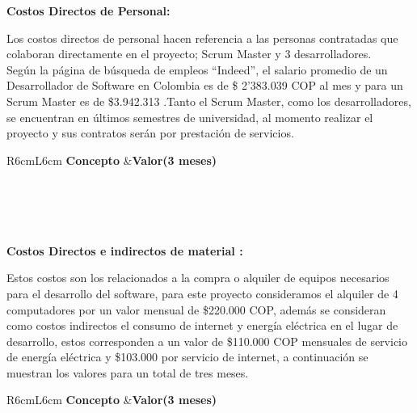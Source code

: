 \documentclass[a4paper,12 pt]{article}
\begin{document}
\textbf{Costos Directos de Personal:}

Los costos directos de personal hacen referencia a las personas contratadas que colaboran directamente en el proyecto; Scrum Master y 3 desarrolladores.\\

Según la página de búsqueda de empleos “Indeed”\cite{01}, el salario promedio de un Desarrollador de Software en Colombia es de \$ 2’383.039 COP al mes y para un Scrum Master es de \$3.942.313 .Tanto el Scrum Master, como los desarrolladores, se encuentran en últimos semestres de universidad, al momento realizar el proyecto y sus contratos serán por prestación de servicios. 

\begin{table}[H]
    \centering
    \small{
    \begin{tabular}{R{6cm}L{6cm}}
        \textbf{Concepto}   &\textbf{Valor(3 meses)}\\
        \\
         \\
         \\
        \hline
         \\
    \end{tabular}
    \label{T03}}
\end{table}{}

\textbf{Costos Directos e indirectos de material :}

Estos costos son los relacionados a la compra o alquiler de equipos necesarios para el desarrollo del software, para este proyecto consideramos el alquiler de 4 computadores\cite{02} por un valor mensual de \$220.000 COP, además se consideran como costos indirectos el consumo de internet y energía eléctrica en el lugar de desarrollo, estos corresponden a un valor de \$110.000 COP mensuales de servicio de energía eléctrica y \$103.000 por servicio de internet, a continuación se muestran los valores para un total de tres meses.
\begin{table}[H]
    \centering
    \small{
    \begin{tabular}{R{6cm}L{6cm}}
        \textbf{Concepto}   &\textbf{Valor(3 meses)}\\
        \\
         \\
         \\
         \\
        \hline
         \\
    \end{tabular}
    \label{T03}}
\end{table}{}
\end{document}
